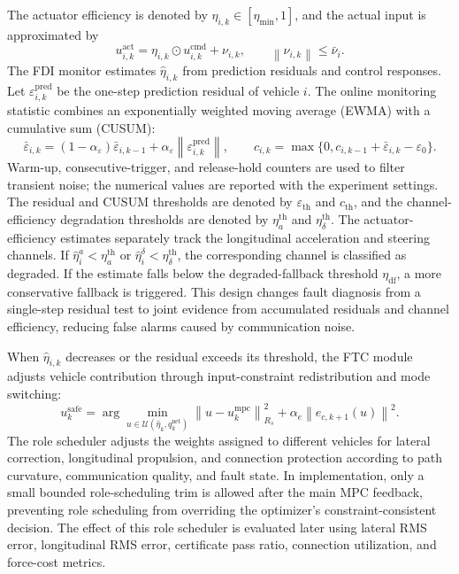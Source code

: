 \documentclass[twocolumn,3p,times,procedia]{elsarticle}
\newcommand{\norm}[1]{\left\lVert #1 \right\rVert}
\begin{document}
The actuator efficiency is denoted by $\eta_{i,k}\in[\eta_{\min},1]$, and the actual input is approximated by
\begin{equation}
u_{i,k}^{\mathrm{act}}=\eta_{i,k}\odot u_{i,k}^{\mathrm{cmd}}+\nu_{i,k},\qquad \norm{\nu_{i,k}}\le \bar\nu_i .
\label{eq:actuator_efficiency}
\end{equation}
The FDI monitor estimates $\hat\eta_{i,k}$ from prediction residuals and control responses. Let $\varepsilon_{i,k}^{\mathrm{pred}}$ be the one-step prediction residual of vehicle $i$. The online monitoring statistic combines an exponentially weighted moving average (EWMA) with a cumulative sum (CUSUM):
\begin{equation}
\bar\varepsilon_{i,k}=(1-\alpha_\varepsilon)\bar\varepsilon_{i,k-1}+\alpha_\varepsilon\norm{\varepsilon_{i,k}^{\mathrm{pred}}},\qquad
c_{i,k}=\max\{0,c_{i,k-1}+\bar\varepsilon_{i,k}-\varepsilon_0\}.
\label{eq:fdi_ewma_cusum}
\end{equation}
Warm-up, consecutive-trigger, and release-hold counters are used to filter transient noise; the numerical values are reported with the experiment settings. The residual and CUSUM thresholds are denoted by $\varepsilon_{\mathrm{th}}$ and $c_{\mathrm{th}}$, and the channel-efficiency degradation thresholds are denoted by $\eta_a^{\mathrm{th}}$ and $\eta_\delta^{\mathrm{th}}$. The actuator-efficiency estimates separately track the longitudinal acceleration and steering channels. If $\hat\eta^a_i<\eta_a^{\mathrm{th}}$ or $\hat\eta^\delta_i<\eta_\delta^{\mathrm{th}}$, the corresponding channel is classified as degraded. If the estimate falls below the degraded-fallback threshold $\eta_{\mathrm{df}}$, a more conservative fallback is triggered. This design changes fault diagnosis from a single-step residual test to joint evidence from accumulated residuals and channel efficiency, reducing false alarms caused by communication noise.

When $\hat\eta_{i,k}$ decreases or the residual exceeds its threshold, the FTC module adjusts vehicle contribution through input-constraint redistribution and mode switching:
\begin{equation}
u_k^{\mathrm{safe}}=\arg\min_{u\in\mathcal U(\hat\eta_k,q_k^{\mathrm{net}})}
\norm{u-u_k^{\mathrm{mpc}}}_{R_s}^2+
\alpha_e\norm{e_{c,k+1}(u)}^2 .
\label{eq:ftc_projection}
\end{equation}
The role scheduler adjusts the weights assigned to different vehicles for lateral correction, longitudinal propulsion, and connection protection according to path curvature, communication quality, and fault state. In implementation, only a small bounded role-scheduling trim is allowed after the main MPC feedback, preventing role scheduling from overriding the optimizer's constraint-consistent decision. The effect of this role scheduler is evaluated later using lateral RMS error, longitudinal RMS error, certificate pass ratio, connection utilization, and force-cost metrics.
\end{document}
